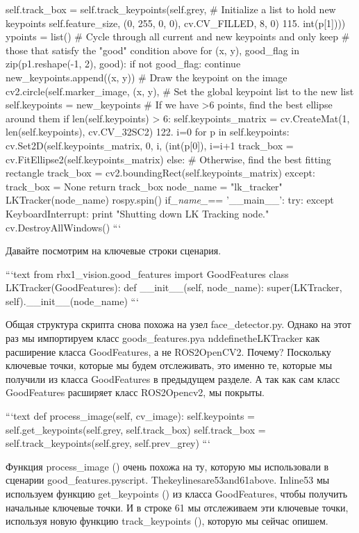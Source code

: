 self.track_box = self.track_keypoints(self.grey,
# Initialize a list to hold new keypoints
self.feature_size, (0, 255, 0, 0), cv.CV_FILLED, 8, 0) 115.
int(p[1]))) 
ypoints = list()
# Cycle through all current and new keypoints and only keep # those that satisfy the "good" condition above
for (x, y), good_flag in zip(p1.reshape(-1, 2), good):
if not good_flag:
    continue
new_keypoints.append((x, y))
# Draw the keypoint on the image
cv2.circle(self.marker_image, (x, y),
# Set the global keypoint list to the new list
self.keypoints = new_keypoints
# If we have >6 points, find the best ellipse around them
if len(self.keypoints) > 6:
self.keypoints_matrix = cv.CreateMat(1,
len(self.keypoints), cv.CV_32SC2) 122. i=0
for p in self.keypoints: cv.Set2D(self.keypoints_matrix, 0, i, (int(p[0]),
i=i+1
track_box = cv.FitEllipse2(self.keypoints_matrix)
else:
# Otherwise, find the best fitting rectangle track_box = cv2.boundingRect(self.keypoints_matrix)
except:
track_box = None
return track_box
node_name = "lk_tracker" LKTracker(node_name) rospy.spin()
if\textit{_name_}== '__main__': try:
except KeyboardInterrupt:
print "Shutting down LK Tracking node." cv.DestroyAllWindows()
```

Давайте посмотрим на ключевые строки сценария.

```text
from rbx1_vision.good_features import GoodFeatures 
class LKTracker(GoodFeatures):
def __init__(self, node_name):
super(LKTracker, self).__init__(node_name)
```

Общая структура скрипта снова похожа на узел face\_detector.py. Однако на этот раз мы импортируем класс goods\_features.pya nddefinetheLKTracker как расширение класса GoodFeatures, а не ROS2OpenCV2. Почему? Поскольку ключевые точки, которые мы будем отслеживать, это именно те, которые мы получили из класса GoodFeatures в предыдущем разделе. А так как сам класс GoodFeatures расширяет класс ROS2Opencv2, мы покрыты.

```text
def process_image(self, cv_image):
self.keypoints = self.get_keypoints(self.grey,
self.track_box)
self.track_box = self.track_keypoints(self.grey,
self.prev_grey)
```

Функция process\_image () очень похожа на ту, которую мы использовали в сценарии good\_features.pyscript. Thekeylinesare53and61above. Inline53 мы используем функцию get\_keypoints () из класса GoodFeatures, чтобы получить начальные ключевые точки. И в строке 61 мы отслеживаем эти ключевые точки, используя новую функцию track\_keypoints (), которую мы сейчас опишем.

